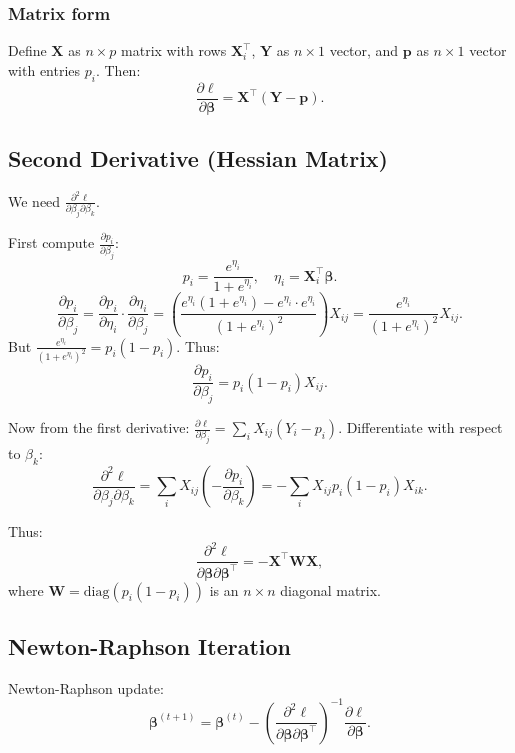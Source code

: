 \documentclass[12pt]{article}
\numberwithin{equation}{section}
\begin{document}
	\subsubsection{Matrix form}
	Define $\mathbf{X}$ as $n \times p$ matrix with rows $\mathbf{X}_i^\top$, $\mathbf{Y}$ as $n \times 1$ vector, and $\mathbf{p}$ as $n \times 1$ vector with entries $p_i$. Then:
	\[
	\frac{\partial \ell}{\partial \boldsymbol{\beta}} = \mathbf{X}^\top (\mathbf{Y} - \mathbf{p}).
	\]
	
	\subsection{Second Derivative (Hessian Matrix)}
	
	We need $\frac{\partial^2 \ell}{\partial \beta_j \partial \beta_k}$.
	
	First compute $\frac{\partial p_i}{\partial \beta_j}$:
	\[
	p_i = \frac{e^{\eta_i}}{1+e^{\eta_i}}, \quad \eta_i = \mathbf{X}_i^\top \boldsymbol{\beta}.
	\]
	\[
	\frac{\partial p_i}{\partial \beta_j} = \frac{\partial p_i}{\partial \eta_i} \cdot \frac{\partial \eta_i}{\partial \beta_j} = \left( \frac{e^{\eta_i}(1+e^{\eta_i}) - e^{\eta_i} \cdot e^{\eta_i}}{(1+e^{\eta_i})^2} \right) X_{ij} = \frac{e^{\eta_i}}{(1+e^{\eta_i})^2} X_{ij}.
	\]
	But $\frac{e^{\eta_i}}{(1+e^{\eta_i})^2} = p_i(1-p_i)$. Thus:
	\[
	\frac{\partial p_i}{\partial \beta_j} = p_i(1-p_i) X_{ij}.
	\]
	
	Now from the first derivative: $\frac{\partial \ell}{\partial \beta_j} = \sum_i X_{ij}(Y_i - p_i)$. Differentiate with respect to $\beta_k$:
	\[
	\frac{\partial^2 \ell}{\partial \beta_j \partial \beta_k} = \sum_i X_{ij} \left( -\frac{\partial p_i}{\partial \beta_k} \right) = -\sum_i X_{ij} p_i(1-p_i) X_{ik}.
	\]
	
	Thus:
	\[
	\frac{\partial^2 \ell}{\partial \boldsymbol{\beta} \partial \boldsymbol{\beta}^\top} = -\mathbf{X}^\top \mathbf{W} \mathbf{X},
	\]
	where $\mathbf{W} = \text{diag}(p_i(1-p_i))$ is an $n \times n$ diagonal matrix.
	
	\subsection{Newton-Raphson Iteration}
	
	Newton-Raphson update:
	\[
	\boldsymbol{\beta}^{(t+1)} = \boldsymbol{\beta}^{(t)} - \left( \frac{\partial^2 \ell}{\partial \boldsymbol{\beta} \partial \boldsymbol{\beta}^\top} \right)^{-1} \frac{\partial \ell}{\partial \boldsymbol{\beta}}.
	\]
	
\end{document}
